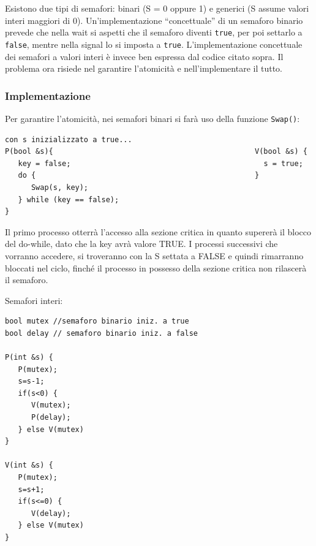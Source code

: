 \documentclass[a4paper]{article}
\begin{document}
Esistono due tipi di semafori: binari (S = 0 oppure 1) e generici (S assume valori interi maggiori di 0). Un'implementazione ``concettuale'' di un semaforo binario prevede che nella wait si aspetti che il semaforo diventi \texttt{true}, per poi settarlo a \texttt{false}, mentre nella signal lo si imposta a \texttt{true}. L'implementazione concettuale dei semafori a valori interi è invece ben espressa dal codice citato sopra. \newline
Il problema ora risiede nel garantire l'atomicità e nell'implementare il tutto.

\subsubsection{Implementazione}
Per garantire l'atomicità, nei semafori binari si farà uso della funzione \texttt{Swap()}:
\begin{verbatim}
con s inizializzato a true...
P(bool &s){                                              V(bool &s) {
   key = false;                                            s = true;
   do {                                                  }
      Swap(s, key);
   } while (key == false);
}
\end{verbatim}
Il primo processo otterrà l'accesso alla sezione critica in quanto supererà il blocco del do-while, dato che la key avrà valore TRUE. I processi successivi che vorranno accedere, si troveranno con la S settata a FALSE e quindi rimarranno bloccati nel ciclo, finché il processo in possesso della sezione critica non rilascerà il semaforo.

Semafori interi:
\begin{verbatim}
bool mutex //semaforo binario iniz. a true
bool delay // semaforo binario iniz. a false

P(int &s) {
   P(mutex);
   s=s-1;
   if(s<0) {
      V(mutex);
      P(delay);
   } else V(mutex)
}

V(int &s) {
   P(mutex);
   s=s+1;
   if(s<=0) {
      V(delay);
   } else V(mutex)
}
\end{verbatim}
\end{document}

